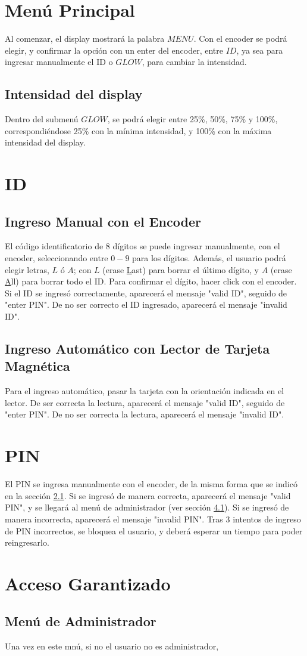 \section{Menú Principal}

Al comenzar, el display mostrará la palabra $MENU$. 
Con el encoder se podrá elegir, y confirmar la opción con un enter del encoder, entre $ID$, 
ya sea para ingresar manualmente el ID o $GLOW$, para cambiar la intensidad.

\subsection{Intensidad del display}

Dentro del submenú $GLOW$, se podrá elegir entre 25\%, 50\%, 75\% y 100\%, 
correspondiéndose 25\% con la mínima intensidad, y 100\% con la máxima intensidad del display.

\section{ID}
\subsection{Ingreso Manual con el Encoder}
\label{pinsection}
El código identificatorio de 8 dígitos se puede ingresar manualmente, con el encoder, 
seleccionando entre $0-9$ para los dígitos. Además, el usuario podrá elegir letras, $L$ ó $A$;
con $L$ (erase \underline{L}ast) para borrar el último dígito, y $A$ (erase \underline{A}ll)
 para borrar todo el ID.
 Para confirmar el dígito, hacer click con el encoder.
 Si el ID se ingresó correctamente, aparecerá el mensaje "valid ID", seguido de "enter PIN".
 De no ser correcto el ID ingresado, aparecerá el mensaje "invalid ID".

 \subsection{Ingreso Automático con Lector de Tarjeta Magnética}
 Para el ingreso automático, pasar la tarjeta con la orientación indicada en el lector.
 De ser correcta la lectura, aparecerá el mensaje "valid ID", seguido de "enter PIN".
 De no ser correcta la lectura, aparecerá el mensaje "invalid ID".

 \section{PIN}
 El PIN se ingresa manualmente con el encoder, de la misma forma 
 que se indicó en la sección \ref{pinsection}.
 Si se ingresó de manera correcta, aparecerá el mensaje "valid PIN", 
 y se llegará al menú de administrador (ver sección \ref{adminmenu}).
Si se ingresó de manera incorrecta, aparecerá el mensaje "invalid PIN".
Tras 3 intentos de ingreso de PIN incorrectos, se bloquea el usuario, 
y deberá esperar un tiempo para poder reingresarlo.

\section{Acceso Garantizado}
\subsection{Menú de Administrador}
 \label{adminmenu}

 Una vez en este mnú, si no el usuario no es administrador,



